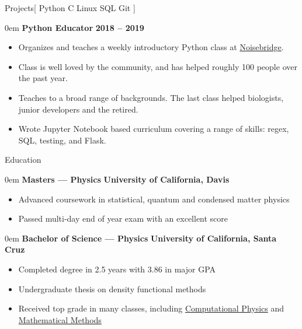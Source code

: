 \documentclass[11pt,a4paper]{article}
\newenvironment{headedsection}[2]{
    \begin{addmargin}[0.5em]{0em}
    {\large\bfseries #1} \hfill {\bfseries #2}%
    \begin{itemize}
        [label={}, topsep=0pt, itemsep=1.5pt, parsep=0pt, leftmargin=1.5em]
}{
    \end{itemize}
    \end{addmargin}
    \medskip
}
\begin{document}
\begin{mysection}{Projects}[
    Python \textbullet{} C \textbullet{} Linux \textbullet{} SQL \textbullet{} Git
]

    \begin{headedsection}{Python Educator}{2018 -- 2019}
        \item Organizes and teaches a weekly introductory Python class at \href{https://www.noisebridge.net/}{Noisebridge}.
        \item Class is well loved by the community, and has helped roughly 100 people over the past year.
        \item Teaches to a broad range of backgrounds.  The last class helped biologists, junior developers and the retired.
        \item Wrote Jupyter Notebook based curriculum covering a range of skills: regex, SQL, testing, and Flask.
    \end{headedsection}


\end{mysection}

\begin{mysection}{Education}
    \begin{headedsection}{Masters --- Physics}
          {University of California, Davis}

        \item Advanced coursework in statistical, quantum and condensed matter
            physics
        \item Passed multi-day end of year exam with an excellent score
    \end{headedsection}

    \begin{headedsection}{Bachelor of Science --- Physics}
          {University of California, Santa Cruz}

        \item Completed degree in 2.5 years with 3.86 in major GPA
        \item Undergraduate thesis on density functional methods
        \item Received top grade in many classes, including 
            \href{http://young.physics.ucsc.edu/115/}{Computational Physics}
            and
            \href{http://scipp.ucsc.edu/~haber/ph116C/}{Mathematical Methods}
    \end{headedsection}
\end{mysection}
\end{document}
